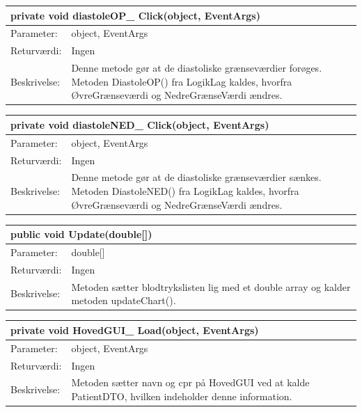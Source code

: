 \begin{table}[H]
\label{tab:tabel2}
\begin{tabular}{| l | p{13cm} |}
   \hline
   \multicolumn{2}{|l|}{private void diastoleOP\_ Click(object, EventArgs)} \\ \hline
   Parameter: & object, EventArgs\\ \hline
   Returværdi: & Ingen \\ \hline
   Beskrivelse: & Denne metode gør at de diastoliske grænseværdier forøges. Metoden DiastoleOP() fra LogikLag kaldes, hvorfra ØvreGrænseværdi og NedreGrænseVærdi ændres.\\ \hline
\end{tabular}
\end{table}
\begin{table}[H]
\label{tab:tabel2}
\begin{tabular}{| l | p{13cm} |}
   \hline
   \multicolumn{2}{|l|}{private void diastoleNED\_ Click(object, EventArgs)} \\ \hline
   Parameter: & object, EventArgs\\ \hline
   Returværdi: & Ingen \\ \hline
   Beskrivelse: &  Denne metode gør at de diastoliske grænseværdier sænkes. Metoden DiastoleNED() fra LogikLag kaldes, hvorfra ØvreGrænseværdi og NedreGrænseVærdi ændres.\\ \hline
\end{tabular}
\end{table}
\begin{table}[H]
\label{tab:tabel2}
\begin{tabular}{| l | p{13cm} |}
   \hline
   \multicolumn{2}{|l|}{public void Update(double[])} \\ \hline
   Parameter: & double[]\\ \hline
   Returværdi: & Ingen \\ \hline
   Beskrivelse: & Metoden sætter blodtrykslisten lig med et double array og kalder metoden updateChart().\\ \hline
\end{tabular}
\end{table}
\begin{table}[H]
\label{tab:tabel2}
\begin{tabular}{| l | p{13cm} |}
   \hline
   \multicolumn{2}{|l|}{private void HovedGUI\_ Load(object, EventArgs)} \\ \hline
   Parameter: & object, EventArgs\\ \hline
   Returværdi: & Ingen \\ \hline
   Beskrivelse: & Metoden sætter navn og cpr på HovedGUI ved at kalde PatientDTO, hvilken indeholder denne information.\\ \hline
\end{tabular}
\end{table}
